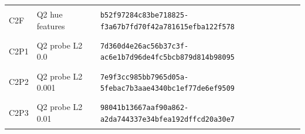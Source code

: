 \begin{longtable}{@{}l>{\raggedright\arraybackslash}p{3.5cm}p{10.8cm}@{}}
\hypertarget{C2F}{C2F} & Q2 hue features & {\fontsize{8.8}{11}\selectfont\texttt{b52f97284c83be718825-f3a67b7fd70f42a781615efba122f578}} \\
\hypertarget{C2P1}{C2P1} & Q2 probe L2 0.0 & {\fontsize{8.8}{11}\selectfont\texttt{7d360d4e26ac56b37c3f-ac6e1b7d96de4fc5bcb879d814b98095}} \\
\hypertarget{C2P2}{C2P2} & Q2 probe L2 0.001 & {\fontsize{8.8}{11}\selectfont\texttt{7e9f3cc985bb7965d05a-5febac7b3aae4340bc1ef77de6ef9509}} \\
\hypertarget{C2P3}{C2P3} & Q2 probe L2 0.01 & {\fontsize{8.8}{11}\selectfont\texttt{98041b13667aaf90a862-a2da744337e34bfea192dffcd20a30e7}} \\
\bottomrule\end{longtable}\endgroup

